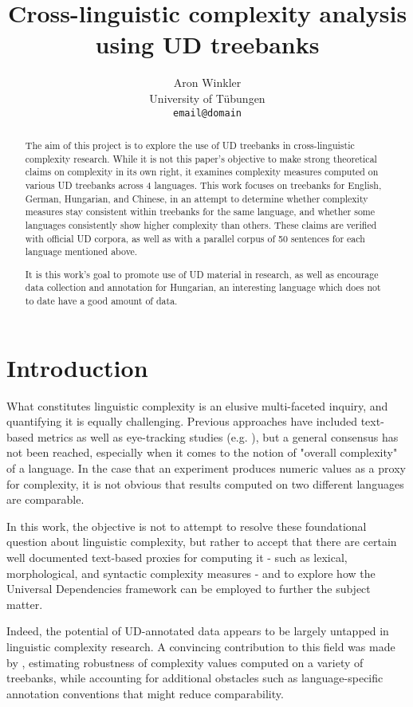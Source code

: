 \documentclass[11pt]{article}
\title{Cross-linguistic complexity analysis using UD treebanks}
\author{Aron Winkler \\
  University of Tübungen \\
  \texttt{email@domain}}
\begin{document}
\maketitle
\begin{abstract}
    The aim of this project is to explore the use of UD treebanks in cross-linguistic complexity research. While it is not this paper's objective to make strong theoretical claims on complexity in its own right, it examines complexity measures computed on various UD treebanks across 4 languages. This work focuses on treebanks for English, German, Hungarian, and Chinese, in an attempt to determine whether complexity measures stay consistent within treebanks for the same language, and whether some languages consistently show higher complexity than others. These claims are verified with official UD corpora, as well as with a parallel corpus of 50 sentences for each language mentioned above.
    
    It is this work's goal to promote use of UD material in research, as well as encourage data collection and annotation for Hungarian, an interesting language which does not to date have a good amount of data.
\end{abstract}

\section{Introduction}

What constitutes linguistic complexity is an elusive multi-faceted inquiry, and quantifying it is equally challenging. Previous approaches have included text-based metrics as well as eye-tracking studies (e.g. \citealp{Lee:2007}), but a general consensus has not been reached, especially when it comes to the notion of "overall complexity" of a language. In the case that an experiment produces numeric values as a proxy for complexity, it is not obvious that results computed on two different languages are comparable.

In this work, the objective is not to attempt to resolve these foundational question about linguistic complexity, but rather to accept that there are certain well documented text-based proxies for computing it - such as lexical, morphological, and syntactic complexity measures - and to explore how the Universal Dependencies framework can be employed to further the subject matter. 

Indeed, the potential of UD-annotated data appears to be largely untapped in linguistic complexity research. A convincing contribution to this field was made by \citealp{berdicevskis-etal-2018-using}, estimating robustness of complexity values computed on a variety of treebanks, while accounting for additional obstacles such as language-specific annotation conventions that might reduce comparability.
\end{document}
